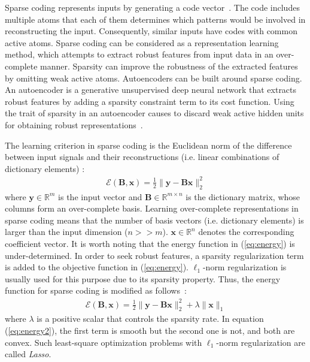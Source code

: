 \documentclass[journal]{IEEEtran}
\def\x{{\mathbf x}}
\def\y{{\mathbf y}}
\def\B{{\mathbf B}}
\begin{document}
Sparse coding represents inputs by generating a code vector~\cite{Olshausen1996, Olshausen1997}. The code includes multiple atoms that each of them determines which patterns would be involved in reconstructing the input. Consequently, similar inputs have codes with common active atoms. Sparse coding can be considered as a representation learning method, which attempts to extract robust features from input data in an over-complete manner. Sparsity can improve the robustness of the extracted features by omitting weak active atoms. Autoencoders can be built around sparse coding. An autoencoder is a generative unsupervised deep neural network that extracts robust features by adding a sparsity constraint term to its cost function. Using the trait of sparsity in an autoencoder causes to discard weak active hidden units for obtaining robust representations~\cite{Makhzani2014}.

The learning criterion in sparse coding is the Euclidean norm of the difference between input signals and their reconstructions (i.e. linear combinations of dictionary elements) \cite{Mairal2012}:
\begin{eqnarray} \label{eq:energy}
\mathcal{E}\left(\B,\x \right) = \frac{1}{2} \| \y-\B \x \|^2_2
\end{eqnarray}
where $\y \in \mathbb{R}^m$  is the input vector and $\B \in \mathbb{R}^{m \times n}$ is the dictionary matrix, whose columns form an over-complete basis. Learning over-complete representations in sparse coding means that the number of basis vectors (i.e. dictionary elements) is larger than the input dimension ($n>>m$). $\x \in \mathbb{R}^n$ denotes the corresponding coefficient vector. It is worth noting that the energy function in (\ref{eq:energy}) is under-determined. In order to seek robust features, a sparsity regularization term is added to the objective function in (\ref{eq:energy}). $\ell_1$-norm regularization is usually used for this purpose due to its sparsity property. Thus, the energy function for sparse coding is modified as follows~\cite{Mairal2012}:
\begin{eqnarray} \label{eq:energy2}
\mathcal{E}\left(\B,\x \right) = \frac{1}{2} \| \y-\B \x \|^2_2 + \lambda \| \x \|_1
\end{eqnarray}
where $\lambda$ is a positive scalar that controls the sparsity rate. In equation (\ref{eq:energy2}), the first term is smooth but the second one is not, and both are convex. Such least-square optimization problems with $\ell_1$-norm regularization are called \textit{Lasso}. 
\end{document}
